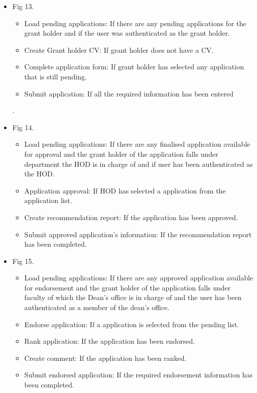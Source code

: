 \documentclass[12pt]{article}
\begin{document}
\begin{itemize}
	\item Fig 13.
		\begin{itemize}
			\item Load pending applications: If there are any pending applications for the grant holder and if the user was authenticated as the grant holder.
			\item Create Grant holder CV: If grant holder does not have a CV.
			\item Complete application form: If grant holder has selected any application that is still pending.
			\item Submit application: If all the required information has been entered									
		\end{itemize}
		.	
	\item Fig 14.
		\begin{itemize}
			\item Load pending applications: If there are any finalised application available for approval and the grant holder of the application falls under department the HOD is in charge of and if user has been authenticated as the HOD.
			\item Application approval: If HOD has selected a application from the application list. 
			\item Create recommendation report: If the application has been approved.				
			\item Submit approved application's information: If the recommendation report has been completed.									
		\end{itemize}
		
	\item Fig 15.
		\begin{itemize}
			\item Load pending applications: If there are any approved application available for endorsement and the grant holder of the application falls under faculty of which the Dean's office is in charge of and the user has been authenticated as a member of the dean's office.
			\item Endorse application: If a application is selected from the pending list. 
			\item Rank application: If the application has been endorsed.	
			\item Create comment: If the application has been ranked.			
			\item Submit endorsed application: If the required endorsement information has been completed.									
		\end{itemize}
	

\end{itemize}
\end{document}
